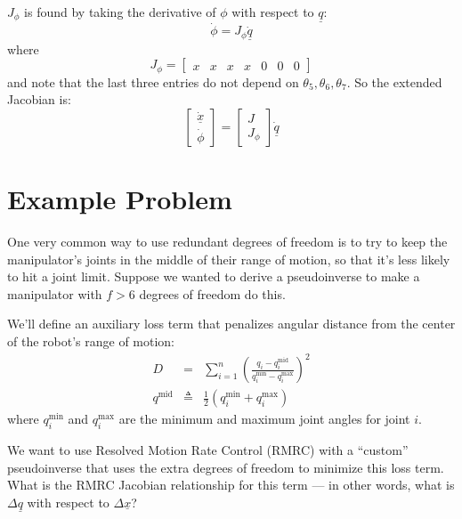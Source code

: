 \documentclass[]{article}
\begin{document}
$J_{\phi}$ is found by taking the derivative of $\phi$ with respect to $\underline{q}$:
\begin{displaymath}
 \dot{\phi} = J_{\phi}\dot{\underline{q}}
\end{displaymath}
where
\begin{displaymath}
 J_{\phi} = \left[ \begin{array}{ccccccc} x & x & x & x & 0 & 0 & 0 \end{array}\right]
\end{displaymath}
and note that the last three entries do not depend on $\theta_{5}, \theta_{6}, \theta_{7}$. So the extended Jacobian is:
\begin{equation}
 \left[ \begin{array}{c} \dot{\underline{x}} \\ \dot{\phi} \end{array} \right] = \left[ \begin{array}{c} J \\ J_{\phi} \end{array} \right] \dot{\underline{q}}
\end{equation}

\section{Example Problem}

One very common way to use redundant degrees of freedom is to try to keep the manipulator's joints in the middle of their range of motion, so that it's less likely to hit a joint limit. Suppose we wanted to derive a pseudoinverse to make a manipulator with $f>6$ degrees of freedom do this.

We'll define an auxiliary loss term that penalizes angular distance from the center of the robot's range of motion:
\begin{eqnarray}
D & = & \sum_{i=1}^{n} \left( \frac{q_{i}-q_{i}^{\mathrm{mid}}}{q_{i}^{\mathrm{min}}-q_{i}^{\mathrm{max}}}\right)^{2} \\
q^{\mathrm{mid}} & \triangleq & \frac{1}{2}\left( q_{i}^{\mathrm{min}} + q_{i}^{\mathrm{max}} \right)
\end{eqnarray}
where $q_{i}^{\mathrm{min}}$ and $q_{i}^{\mathrm{max}}$ are the minimum and maximum joint angles for joint $i$.
 
 We want to use Resolved Motion Rate Control (RMRC) with a ``custom'' pseudoinverse that uses the extra degrees of freedom to minimize this loss term. What is the RMRC Jacobian relationship for this term --- in other words, what is $\Delta \underline{q}$ with respect to $\Delta\underline{x}$?
\end{document}
